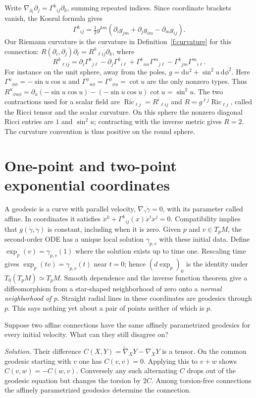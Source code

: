 Write $\nabla_{\partial_i}\partial_j=\Gamma^k{}_{ij}\partial_k$, summing repeated indices. Since coordinate brackets vanish, the Koszul formula gives
\[
 \Gamma^k{}_{ij}=\tfrac12 g^{km}(\partial_i g_{jm}+\partial_j g_{im}-\partial_m g_{ij}).
\]
Our Riemann curvature is the curvature in Definition~\ref{f:curvature} for this connection: $R(\partial_i,\partial_j)\partial_\ell=R^k{}_{\ell i j}\partial_k$, where
\[
 R^k{}_{\ell i j}=\partial_i\Gamma^k{}_{j\ell}-\partial_j\Gamma^k{}_{i\ell}
 +\Gamma^k{}_{im}\Gamma^m{}_{j\ell}-\Gamma^k{}_{jm}\Gamma^m{}_{i\ell} .
\]
For instance on the unit sphere, away from the poles, $g=\mathrm du^2+\sin^2 u\,\mathrm d\phi^2$. Here $\Gamma^u{}_{\phi\phi}=-\sin u\cos u$ and $\Gamma^\phi{}_{u\phi}=\Gamma^\phi{}_{\phi u}=\cot u$ are the only nonzero types. Thus $R^u{}_{\phi u\phi}=\partial_u(-\sin u\cos u)-(-\sin u\cos u)\cot u=\sin^2u$. The two contractions used for a scalar field are $\operatorname{Ric}_{\ell j}=R^i{}_{\ell i j}$ and $R=g^{\ell j}\operatorname{Ric}_{\ell j}$, called the Ricci tensor and the scalar curvature. On this sphere the nonzero diagonal Ricci entries are $1$ and $\sin^2 u$; contracting with the inverse metric gives $R=2$. The curvature convention is thus positive on the round sphere.

\section{One-point and two-point exponential coordinates}

A geodesic is a curve with parallel velocity, $\nabla_{\dot\gamma}\dot\gamma=0$, with its parameter called affine. In coordinates it satisfies $\ddot x^k+\Gamma^k{}_{ij}(x)\dot x^i\dot x^j=0$. Compatibility implies that $g(\dot\gamma,\dot\gamma)$ is constant, including when it is zero. Given $p$ and $v\in T_pM$, the second-order ODE has a unique local solution $\gamma_{p,v}$ with these initial data. Define $\exp_p(v)=\gamma_{p,v}(1)$ where the solution exists up to time one. Rescaling time gives $\exp_p(tv)=\gamma_{p,v}(t)$ near $t=0$; hence $(d\exp_p)_0$ is the identity under $T_0(T_pM)\simeq T_pM$. Smooth dependence and the inverse function theorem give a diffeomorphism from a star-shaped neighborhood of zero onto a \emph{normal neighborhood of $p$}. Straight radial lines in these coordinates are geodesics through $p$. This says nothing yet about a pair of points neither of which is $p$.

\begin{exercise}
Suppose two affine connections have the same affinely parametrized geodesics for every initial velocity. What can they still disagree on?

\emph{Solution.} Their difference $C(X,Y)=\widetilde\nabla_XY-\nabla_XY$ is a tensor. On the common geodesic starting with $v$ one has $C(v,v)=0$. Applying this to $v+w$ shows $C(v,w)=-C(w,v)$. Conversely any such alternating $C$ drops out of the geodesic equation but changes the torsion by $2C$. Among torsion-free connections the affinely parametrized geodesics determine the connection.
\end{exercise}

